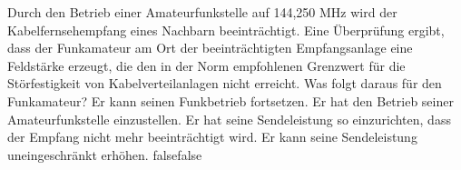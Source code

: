     {Durch den Betrieb einer Amateurfunkstelle auf 144,250 MHz wird der Kabelfernsehempfang eines Nachbarn beeinträchtigt. Eine Überprüfung ergibt, dass der Funkamateur am Ort der beeinträchtigten Empfangsanlage eine Feldstärke erzeugt, die den in der Norm empfohlenen Grenzwert für die Störfestigkeit von Kabelverteilanlagen nicht erreicht. Was folgt daraus für den Funkamateur?}
    {Er kann seinen Funkbetrieb fortsetzen.}
    {Er hat den Betrieb seiner Amateurfunkstelle einzustellen.}
    {Er hat seine Sendeleistung so einzurichten, dass der Empfang nicht mehr beeinträchtigt wird.}
    {Er kann seine Sendeleistung uneingeschränkt erhöhen.}
    {false}{false}